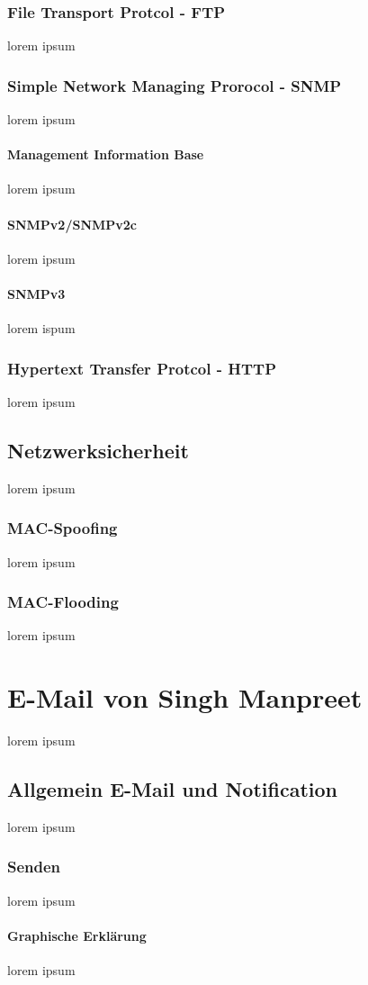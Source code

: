 \documentclass[12pt,a4paper]{report}
\begin{document}
\subsection{File Transport Protcol - FTP}
lorem ipsum
\subsection{Simple Network Managing Prorocol - SNMP}
lorem ipsum
\subsubsection{Management Information Base}
lorem ipsum
\subsubsection{SNMPv2/SNMPv2c}
lorem ipsum
\subsubsection{SNMPv3}
lorem ispum
\subsection{Hypertext Transfer Protcol - HTTP}
lorem ipsum
\section{Netzwerksicherheit}
lorem ipsum
\subsection{MAC-Spoofing}\label{ssec:mspoof}
lorem ipsum
\subsection{MAC-Flooding}\label{ssec:mflood}
lorem ipsum

\chapter{E-Mail von Singh Manpreet}
lorem ipsum
\section{Allgemein E-Mail und Notification}
lorem ipsum
\subsection{Senden}
lorem ipsum
\subsubsection{Graphische Erklärung}
lorem ipsum
\end{document}

